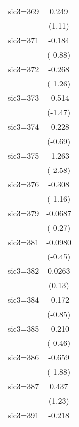 \begin{table}[htbp]
\begin{tabular*}{0.8\hsize}{@{\hskip\tabcolsep\extracolsep\fill}l*{1}{c}}
\addlinespace
sic3=369            &       0.249         \\
                    &      (1.11)         \\
\addlinespace
sic3=371            &      -0.184         \\
                    &     (-0.88)         \\
\addlinespace
sic3=372            &      -0.268         \\
                    &     (-1.26)         \\
\addlinespace
sic3=373            &      -0.514         \\
                    &     (-1.47)         \\
\addlinespace
sic3=374            &      -0.228         \\
                    &     (-0.69)         \\
\addlinespace
sic3=375            &      -1.263\sym{**} \\
                    &     (-2.58)         \\
\addlinespace
sic3=376            &      -0.308         \\
                    &     (-1.16)         \\
\addlinespace
sic3=379            &     -0.0687         \\
                    &     (-0.27)         \\
\addlinespace
sic3=381            &     -0.0980         \\
                    &     (-0.45)         \\
\addlinespace
sic3=382            &      0.0263         \\
                    &      (0.13)         \\
\addlinespace
sic3=384            &      -0.172         \\
                    &     (-0.85)         \\
\addlinespace
sic3=385            &      -0.210         \\
                    &     (-0.46)         \\
\addlinespace
sic3=386            &      -0.659         \\
                    &     (-1.88)         \\
\addlinespace
sic3=387            &       0.437         \\
                    &      (1.23)         \\
\addlinespace
sic3=391            &      -0.218         \\

\end{tabular*}
\end{table}
